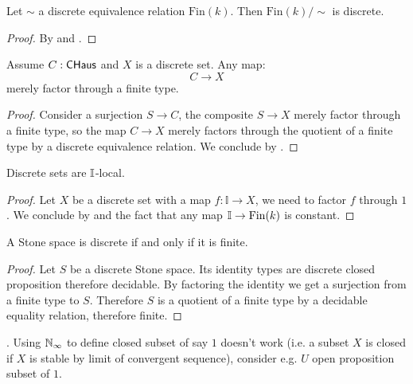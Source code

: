 \begin{corollary}
Let $\sim$ a discrete equivalence relation $\mathrm{Fin}(k)$. Then $\mathrm{Fin}(k)/\sim$ is discrete.
\end{corollary}

\begin{proof}
By  and .
\end{proof}

\begin{lemma}\label{compact-hausdorff-discrete-quotient-finite-factorisation}
Assume $C:\mathsf{CHaus}$ and $X$ is a discrete set. Any map:
\[C\to X\]
merely factor through a finite type. 
\end{lemma}

\begin{proof}
Consider a surjection $S\to C$, the composite $S\to X$ merely factor through a finite type, so the map $C\to X$ merely factors through the quotient of a finite type by a discrete equivalence relation. We conclude by .
\end{proof}

\begin{proposition}
Discrete sets are $\mathbb{I}$-local.
\end{proposition}

\begin{proof}
Let $X$ be a discrete set with a map $f:\mathbb{I}\to X$, we need to factor $f$ through $1$. We conclude by  and the fact that any map $\mathbb{I}\to \mathrm{Fin}(k)$ is constant.
\end{proof}

\begin{lemma}
A Stone space is discrete if and only if it is finite.
\end{lemma}

\begin{proof}
Let $S$ be a discrete Stone space. Its identity types are discrete closed proposition therefore decidable. By factoring the identity we get a surjection from a finite type to $S$. Therefore $S$ is a quotient of a finite type by a decidable equality relation, therefore finite. 
\end{proof}

\begin{remark}
. Using $\mathbb{N}_{\infty}$ to define closed subset of say $1$ doesn't work (i.e. a subset $X$ is closed if $X$ is stable by limit of convergent sequence), consider e.g. $U$ open proposition subset of $1$.
\end{remark}


